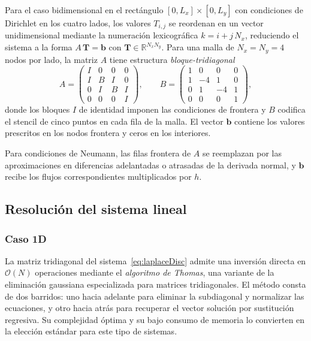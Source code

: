 \documentclass[11pt,a4paper,twocolumn]{article}
\begin{document}
Para el caso bidimensional en el rectángulo $[0,L_x]\times[0,L_y]$
con condiciones de Dirichlet en los cuatro lados, los valores $T_{i,j}$
se reordenan en un vector unidimensional mediante la numeración
lexicográfica $k = i + j\,N_x$, reduciendo el sistema a la forma
$A\,\mathbf{T} = \mathbf{b}$ con $\mathbf{T}\in\mathbb{R}^{N_x N_y}$.
Para una malla de $N_x = N_y = 4$ nodos por lado, la matriz $A$ tiene
estructura \emph{bloque-tridiagonal}
\begin{equation}
A =
\begin{pmatrix}
I & 0 & 0 & 0 \\
I & B & I & 0 \\
0 & I & B & I \\
0 & 0 & 0 & I
\end{pmatrix},
\qquad
B =
\begin{pmatrix}
1 & 0 & 0 & 0 \\
1 & -4 & 1 & 0 \\
0 & 1 & -4 & 1 \\
0 & 0 & 0 & 1
\end{pmatrix},
\label{eq:matrizDirichlet2D}
\end{equation}
donde los bloques $I$ de identidad imponen las condiciones de frontera
y $B$ codifica el stencil de cinco puntos en cada fila de la malla.
El vector $\mathbf{b}$ contiene los valores prescritos en los nodos
frontera y ceros en los interiores.

Para condiciones de Neumann, las filas frontera de $A$ se reemplazan
por las aproximaciones en diferencias adelantadas o atrasadas de la
derivada normal, y $\mathbf{b}$ recibe los flujos correspondientes
multiplicados por $h$. 
\subsection{Resolución del sistema lineal}

\subsubsection{Caso 1D}

La matriz tridiagonal del sistema~\eqref{eq:laplaceDisc} admite una
inversión directa en $\mathcal{O}(N)$ operaciones mediante el
\emph{algoritmo de Thomas}, una variante de la eliminación gaussiana
especializada para matrices tridiagonales. El método consta de dos
barridos: uno hacia adelante para eliminar la subdiagonal y normalizar
las ecuaciones, y otro hacia atrás para recuperar el vector solución
por sustitución regresiva. Su complejidad óptima y su bajo consumo de
memoria lo convierten en la elección estándar para este tipo de
sistemas.
\end{document}
